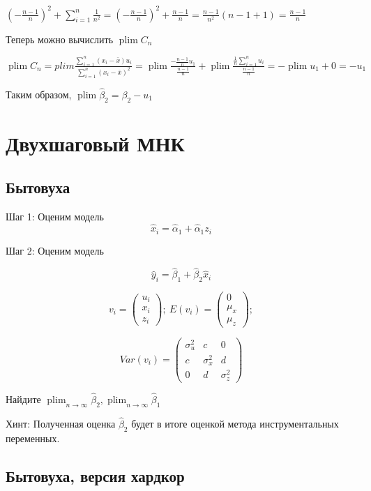 \documentclass[10pt, a4paper]{extarticle}
\def \hb{\hat{\beta}}
\DeclareMathOperator{\plim}{plim}
\begin{document}
$ \left( -\frac{n-1}{n} \right)^2 + \sum_{i = 1}^n \frac{1}{n^2} = \left( -\frac{n-1}{n} \right)^2 + \frac{n-1}{n} = \frac{n-1}{n^2}(n - 1 + 1)  = \frac{n - 1}{n}$

Теперь можно вычислить $\plim C_n$

$\plim C_n = plim \frac{\sum_{i = 1}^n(x_i - \bar{x})u_i}{\sum_{i = 1}^n(x_i - \bar{x})^2} = 
\plim \frac{-\frac{n - 1}{n}u_1}{\frac{n-1}{n}} + \plim \frac{\frac{1}{n}\sum_{i = 1}^nu_i}{\frac{n - 1}{n}} = -\plim u_1 + 0 = -u_1$

Таким образом, $\plim \hb_2 = \beta_2 - u_1$
\section{Двухшаговый МНК}


\subsection{Бытовуха}

Шаг 1: Оценим модель
\[
\hat{x}_i = \hat{\alpha}_1 + \hat{\alpha}_1 z_i
\]

Шаг 2: Оценим модель

\[
\hat{y}_i = \hb_1 + \hb_2 \hat{x}_i
\]

\[
v_{i} = \begin{pmatrix}  u_{i} \\ x_{i} \\  z_{i} \end{pmatrix}; \ E(v_{i}) = \begin{pmatrix}  0 \\ \mu_{x} \\ \mu_{z} \end{pmatrix};
\]

\[
Var(v_{i}) = \begin{pmatrix}  \sigma_{u}^2 & c & 0 \\
c & \sigma_{x}^2  & d \\
0 & d  & \sigma_z^2 \end{pmatrix}
\]

Найдите $\plim_{n \to \infty} \hat \beta_{2}, \plim_{n \to \infty} \hat \beta_{1}$

Хинт: Полученная оценка $\hat \beta_{2}$ будет в итоге оценкой метода инструментальных переменных.


\subsection{Бытовуха, версия хардкор}
\end{document}

